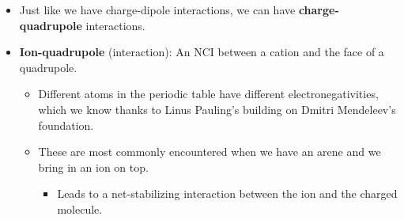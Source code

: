 \documentclass[../notes.tex]{subfiles}
\begin{document}
\begin{itemize}
\begin{figure}[h!]
        \caption{Quadrupole examples.}
        \label{fig:quadrupoleEx}
    \end{figure}
    \begin{itemize}
        \item A $d_{z^2}$ orbital has two dipoles that cancel each other out (Figure \ref{fig:quadrupoleExa}).
        \begin{itemize}
            \item In contrast, dipoles are like $p$-orbitals (Figure \ref{fig:quadrupoleExb}).\footnote{Alex drew the dipole arrow in the inverse direction here by accident.}
            \item Note that orbitals aren't polar; these analogies are given to illustrate phasing properties.
        \end{itemize}
        \item You don't need a $d$-orbital to have a quadrupole, though --- they exist in organic chemistry, too!
        \item Example of quadrupolar molecules in organic chemistry: Benzene (Figure \ref{fig:quadrupoleExc}).
        \begin{itemize}
            \item All  bonds have dipoles that cancel each other out.
            \item However, the net transfer of electron density increases the electron density in the $\pi$-cloud, even as it depletes the electron density at the hydrogens.
        \end{itemize}
        \item Example of quadrupolar molecules in organic chemistry: .
    \end{itemize}
    \item Just like we have charge-dipole interactions, we can have \textbf{charge-quadrupole} interactions.
    \item \textbf{Ion-quadrupole} (interaction): An NCI between a cation and the face of a quadrupole.
    \begin{itemize}
        \item Different atoms in the periodic table have different electronegativities, which we know thanks to Linus Pauling's building on Dmitri Mendeleev's foundation.
        \item These are most commonly encountered when we have an arene and we bring in an ion on top.
        \begin{itemize}
            \item Leads to a net-stabilizing interaction between the ion and the charged molecule.

\end{itemize}
\end{itemize}
\end{itemize}
\end{document}
